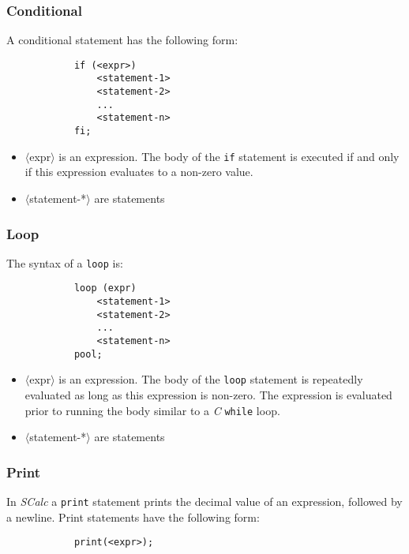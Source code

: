 \documentclass{article}
\newcommand{\code}[1]{\texttt{\textmd{#1}}}
\begin{document}
	\subsubsection{Conditional}

		A conditional statement has the following form:

		\begin{lstlisting}
			if (<expr>)
				<statement-1>
				<statement-2>
				...
				<statement-n>
			fi;
		\end{lstlisting}

		\begin {itemize}
			\item{$\langle$expr$\rangle$} is an expression. The body of the \code{if} statement is executed if and only
			if this expression evaluates to a non-zero value.
			\item{$\langle$statement-*$\rangle$} are statements
		\end{itemize}


	\subsubsection{Loop}

		The syntax of a \code{loop} is:

		\begin{lstlisting}
			loop (expr)
				<statement-1>
				<statement-2>
				...
				<statement-n>
			pool;
		\end{lstlisting}

		\begin {itemize}
			\item{$\langle$expr$\rangle$} is an expression. The body of the \texttt{loop} statement is repeatedly evaluated as long as
			this expression is non-zero. The expression is evaluated prior to running the body similar to a \textit{C} \texttt{while} loop.
			\item{$\langle$statement-*$\rangle$} are statements
		\end{itemize}


	\subsubsection{Print}

		In \textit{SCalc} a \texttt{print} statement prints the decimal value of an expression, followed by a newline.
		Print statements have the following form:

		\begin{lstlisting}
			print(<expr>);
		\end{lstlisting}
\end{document}
